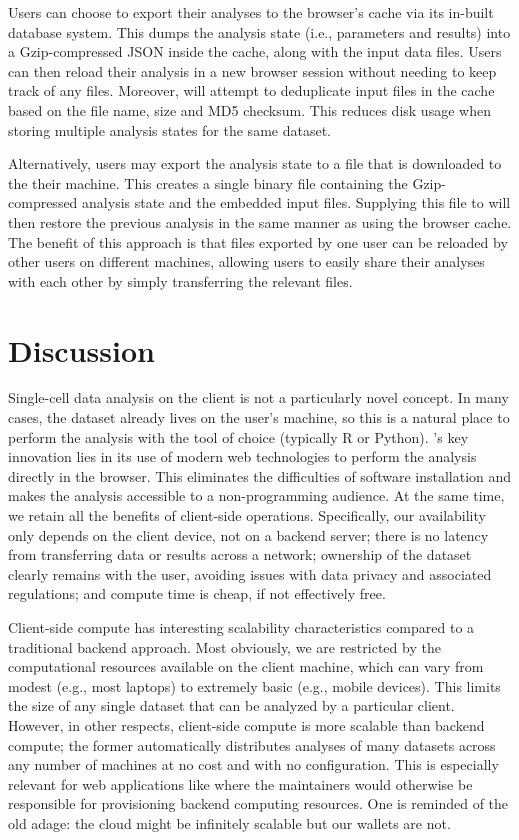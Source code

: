 \documentclass{article}
\begin{document}
Users can choose to export their analyses to the browser's cache via its in-built  database system.
This dumps the analysis state (i.e., parameters and results) into a Gzip-compressed JSON inside the cache, along with the input data files.
Users can then reload their analysis in a new browser session without needing to keep track of any files.
Moreover,  will attempt to deduplicate input files in the cache based on the file name, size and MD5 checksum.
This reduces disk usage when storing multiple analysis states for the same dataset. 

Alternatively, users may export the analysis state to a file that is downloaded to the their machine.
This creates a single binary file containing the Gzip-compressed analysis state and the embedded input files.
Supplying this file to  will then restore the previous analysis in the same manner as using the browser cache.
The benefit of this approach is that files exported by one user can be reloaded by other users on different machines,
allowing users to easily share their analyses with each other by simply transferring the relevant files.

\section{Discussion}

Single-cell data analysis on the client is not a particularly novel concept.
In many cases, the dataset already lives on the user's machine, so this is a natural place to perform the analysis with the tool of choice (typically R or Python).
's key innovation lies in its use of modern web technologies to perform the analysis directly in the browser.
This eliminates the difficulties of software installation and makes the analysis accessible to a non-programming audience.
At the same time, we retain all the benefits of client-side operations.
Specifically, our availability only depends on the client device, not on a backend server;
there is no latency from transferring data or results across a network;
ownership of the dataset clearly remains with the user, avoiding issues with data privacy and associated regulations;
and compute time is cheap, if not effectively free.

Client-side compute has interesting scalability characteristics compared to a traditional backend approach.
Most obviously, we are restricted by the computational resources available on the client machine,
which can vary from modest (e.g., most laptops) to extremely basic (e.g., mobile devices).
This limits the size of any single dataset that can be analyzed by a particular client.
However, in other respects, client-side compute is more scalable than backend compute;
the former automatically distributes analyses of many datasets across any number of machines at no cost and with no configuration.
This is especially relevant for web applications like  where the maintainers would otherwise be responsible for provisioning backend computing resources.
One is reminded of the old adage: the cloud might be infinitely scalable but our wallets are not.
\end{document}
